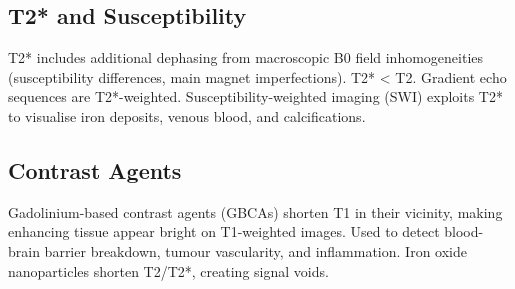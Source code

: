 \subsection{T2* and Susceptibility}

				

T2* includes additional dephasing from macroscopic B0 field inhomogeneities (susceptibility differences, main magnet imperfections). T2* \textless{} T2. Gradient echo sequences are T2*-weighted. Susceptibility-weighted imaging (SWI) exploits T2* to visualise iron deposits, venous blood, and calcifications.

				

\subsection{Contrast Agents}

				

Gadolinium-based contrast agents (GBCAs) shorten T1 in their vicinity, making enhancing tissue appear bright on T1-weighted images. Used to detect blood-brain barrier breakdown, tumour vascularity, and inflammation. Iron oxide nanoparticles shorten T2/T2*, creating signal voids.



